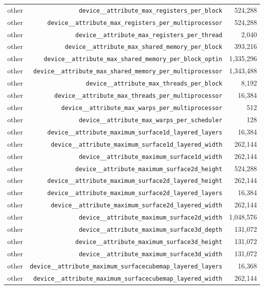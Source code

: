 \begin{table}[h]
\begin{tabular}{|l|r|r|}
other & \texttt{device__attribute_max_registers_per_block} & 524,288 \\
other & \texttt{device__attribute_max_registers_per_multiprocessor} & 524,288 \\
other & \texttt{device__attribute_max_registers_per_thread} & 2,040 \\
other & \texttt{device__attribute_max_shared_memory_per_block} & 393,216 \\
other & \texttt{device__attribute_max_shared_memory_per_block_optin} & 1,335,296 \\
other & \texttt{device__attribute_max_shared_memory_per_multiprocessor} & 1,343,488 \\
other & \texttt{device__attribute_max_threads_per_block} & 8,192 \\
other & \texttt{device__attribute_max_threads_per_multiprocessor} & 16,384 \\
other & \texttt{device__attribute_max_warps_per_multiprocessor} & 512 \\
other & \texttt{device__attribute_max_warps_per_scheduler} & 128 \\
other & \texttt{device__attribute_maximum_surface1d_layered_layers} & 16,384 \\
other & \texttt{device__attribute_maximum_surface1d_layered_width} & 262,144 \\
other & \texttt{device__attribute_maximum_surface1d_width} & 262,144 \\
other & \texttt{device__attribute_maximum_surface2d_height} & 524,288 \\
other & \texttt{device__attribute_maximum_surface2d_layered_height} & 262,144 \\
other & \texttt{device__attribute_maximum_surface2d_layered_layers} & 16,384 \\
other & \texttt{device__attribute_maximum_surface2d_layered_width} & 262,144 \\
other & \texttt{device__attribute_maximum_surface2d_width} & 1,048,576 \\
other & \texttt{device__attribute_maximum_surface3d_depth} & 131,072 \\
other & \texttt{device__attribute_maximum_surface3d_height} & 131,072 \\
other & \texttt{device__attribute_maximum_surface3d_width} & 131,072 \\
other & \texttt{device__attribute_maximum_surfacecubemap_layered_layers} & 16,368 \\
other & \texttt{device__attribute_maximum_surfacecubemap_layered_width} & 262,144 \\

\end{tabular}
\end{table}
